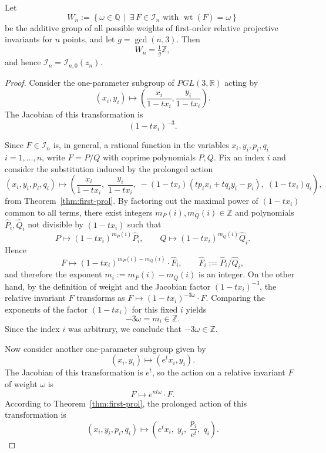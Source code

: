 \documentclass[10pt,a4paper]{amsart}
\begin{document}
\begin{theorem}
Let
\[
W_n := \left\{ \omega \in \mathbb{Q} \,\middle|\, \exists\, F \in \mathcal{I}_n \text{ with } \operatorname{wt}(F) = \omega \right\}
\]
be the additive group of all possible weights of first-order relative projective invariants for \( n \) points, and let \( g = \gcd(n, 3) \). Then
\[
W_n = \tfrac{1}{g} \mathbb{Z},
\]
and hence \( \mathcal{I}_n = \mathcal{I}_{n,0}(z_n) \).
\end{theorem}

\begin{proof}

Consider the one-parameter subgroup of \( PGL(3, \mathbb{R}) \) acting by
\[
(x_i, y_i) \mapsto \left( \frac{x_i}{1 - tx_i}, \frac{y_i}{1 - tx_i} \right).
\]
The Jacobian of this transformation is
\[
(1 - tx_i)^{-3}.
\]


Since \(F\in\mathcal{I}_n\) is, in general, a rational function in the variables
\(x_i,y_i,p_i,q_i\) $i=1,\ldots, n$, write \(F=P/Q\) with coprime polynomials \(P,Q\).
Fix an index \(i\) and consider the substitution induced by the prolonged action 
\[
(x_i, y_i, p_i, q_i) \mapsto \left(
\frac{x_i}{1 - tx_i},\;
\frac{y_i}{1 - tx_i},\;
-(1 - tx_i)\left( t p_i x_i + t q_i y_i - p_i \right),\;
(1 - tx_i) q_i
\right),
\]
from Theorem~\ref{thm:first-prol}.
By factoring out the maximal power of \((1-tx_i)\) common to all terms, there exist integers
\(m_P(i),m_Q(i)\in\mathbb{Z}\) and polynomials \(\widehat P_i,\widehat Q_i\) not divisible by \((1-tx_i)\) such that
\[
P \mapsto(1-tx_i)^{m_P(i)}\widehat P_i,\qquad
Q\mapsto(1-tx_i)^{m_Q(i)}\widehat Q_i.
\]
Hence
\[
F \mapsto(1-tx_i)^{m_P(i)-m_Q(i)}\cdot \widehat F_i,\qquad
\widehat F_i:=\widehat P_i/\widehat Q_i,
\]
and therefore the exponent \(m_i:=m_P(i)-m_Q(i)\) is an integer.
On the other hand, by the definition of weight and the Jacobian factor \((1-tx_i)^{-3}\),
the relative invariant \(F\) transforms as
\(
F \mapsto (1-tx_i)^{-3\omega}\cdot F.
\)
Comparing the exponents of the factor \((1-tx_i)\) for this fixed \(i\) yields
\[
-3\omega=m_i\in\mathbb{Z}.
\]
Since the index \(i\) was arbitrary, we conclude that \(-3\omega\in\mathbb{Z}\).


Now consider another one-parameter subgroup given by
\[
(x_i, y_i) \mapsto (e^t x_i, y_i).
\]
The Jacobian of this transformation is \( e^t \), so the action on a relative invariant \( F \) of weight \( \omega \) is
\[
F \mapsto e^{nt\omega} \cdot F.
\]
According to Theorem~\ref{thm:first-prol}, the prolonged action of this transformation is
\[
(x_i, y_i, p_i, q_i) \mapsto \left(e^t x_i,\; y_i,\; \frac{p_i}{e^t},\; q_i\right).
\]



\end{proof}
\end{document}
